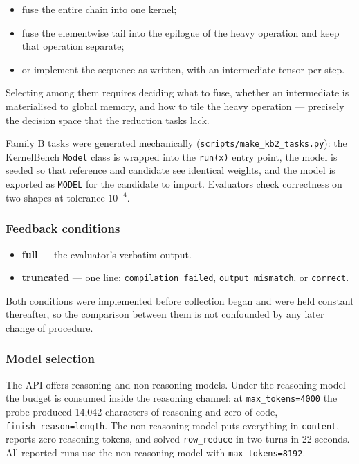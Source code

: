 \documentclass[
  11pt,
]{article}
\providecommand{\tightlist}{%
  \setlength{\itemsep}{0pt}\setlength{\parskip}{0pt}}
\begin{document}
\begin{itemize}
\tightlist
\item
  fuse the entire chain into one kernel;
\item
  fuse the elementwise tail into the epilogue of the heavy operation and
  keep that operation separate;
\item
  or implement the sequence as written, with an intermediate tensor per
  step.
\end{itemize}

Selecting among them requires deciding what to fuse, whether an
intermediate is materialised to global memory, and how to tile the heavy
operation --- precisely the decision space that the reduction tasks
lack.

Family B tasks were generated mechanically
(\texttt{scripts/make\_kb2\_tasks.py}): the KernelBench \texttt{Model}
class is wrapped into the \texttt{run(x)} entry point, the model is
seeded so that reference and candidate see identical weights, and the
model is exported as \texttt{MODEL} for the candidate to import.
Evaluators check correctness on two shapes at tolerance \(10^{-4}\).

\hypertarget{feedback-conditions}{%
\subsubsection{Feedback conditions}\label{feedback-conditions}}

\begin{itemize}
\tightlist
\item
  \textbf{full} --- the evaluator's verbatim output.
\item
  \textbf{truncated} --- one line: \texttt{compilation\ failed},
  \texttt{output\ mismatch}, or \texttt{correct}.
\end{itemize}

Both conditions were implemented before collection began and were held
constant thereafter, so the comparison between them is not confounded by
any later change of procedure.

\hypertarget{model-selection}{%
\subsubsection{Model selection}\label{model-selection}}

The API offers reasoning and non-reasoning models. Under the reasoning
model the budget is consumed inside the reasoning channel: at
\texttt{max\_tokens=4000} the probe produced 14,042 characters of
reasoning and zero of code, \texttt{finish\_reason=length}. The
non-reasoning model puts everything in \texttt{content}, reports zero
reasoning tokens, and solved \texttt{row\_reduce} in two turns in 22
seconds. All reported runs use the non-reasoning model with
\texttt{max\_tokens=8192}.
\end{document}
